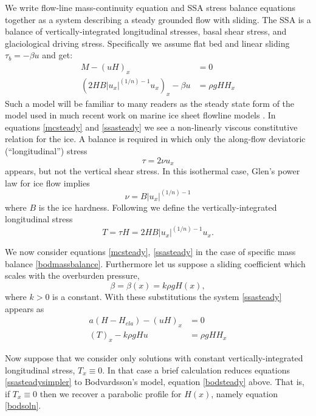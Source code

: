 \documentclass[twocolumn,letterpaper]{igs}
\begin{document}
We write flow-line mass-continuity equation and SSA stress balance equations together as a system describing a steady grounded flow with sliding.  The SSA is a balance of vertically-integrated longitudinal stresses, basal shear stress, and glaciological driving stress.  Specifically we assume flat bed and linear sliding $\tau_b = -\beta u$ and get:
\begin{align}
M - (u H)_x &= 0 \label{mcsteady} \\
\left(2 H B |u_x|^{(1/n)-1} u_x\right)_x - \beta u &= \rho g H H_x  \label{ssasteady}
\end{align}
Such a model will be familiar to many readers as the steady state form of the model used in much recent work on marine ice sheet flowline models \citep[e.g.][]{SchoofMarine1}.  In equations \eqref{mcsteady} and \eqref{ssasteady} we see a non-linearly viscous constitutive relation for the ice.  A balance is required in which only the along-flow deviatoric (``longitudinal'') stress
	$$\tau = 2 \nu u_x$$
appears, but not the vertical shear stress.  In this isothermal case, Glen's power law for ice flow implies
	$$\nu = B |u_x|^{(1/n)-1}$$
where $B$ is the ice hardness.  Following \cite{SchoofStream} we define the vertically-integrated longitudinal stress
\begin{equation}
T = \tau H = 2 H B |u_x|^{(1/n)-1} u_x.  \label{schoofsT}
\end{equation}

We now consider equations \eqref{mcsteady}, \eqref{ssasteady} in the case of specific mass balance \eqref{bodmassbalance}.
Furthermore let us suppose a sliding coefficient which scales with the overburden pressure,
\begin{equation}
\beta = \beta(x) = k \rho g H(x),\label{betadefine}
\end{equation}
where $k>0$ is a constant.  With these substitutions the system \eqref{ssasteady} appears as
\begin{align}
a(H-H_{ela}) - (u H)_x &= 0 \label{mcsteadysimpler} \\
\left(T\right)_x - k \rho g H u &= \rho g H H_x \label{ssasteadysimpler}
\end{align}

Now suppose that we consider only solutions with constant vertically-integrated longitudinal stress, $T_x \equiv 0$.  In that case a brief calculation reduces equations \eqref{ssasteadysimpler} to Bodvardsson's model, equation \eqref{bodsteady} above.  That is, if $T_x \equiv 0$ then we recover a parabolic profile for $H(x)$, namely equation \eqref{bodsoln}.
\end{document}
